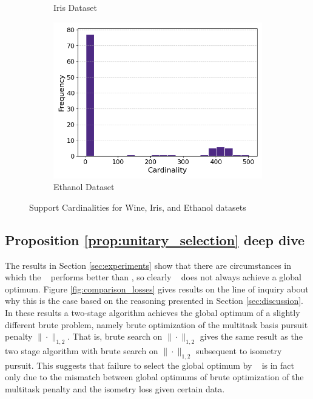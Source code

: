 \begin{figure}[t]
\begin{subfigure}[b]{0.3\textwidth}
        \caption{Iris Dataset}
        \label{fig:iris_cardinalities}
    \end{subfigure}
    \hfill
    \begin{subfigure}[b]{0.3\textwidth}
        \centering
        \includegraphics[width=\textwidth]{../figures/ethanol_cardinalities}
        \caption{Ethanol Dataset}
        \label{fig:ethanol_cardinalities}
    \end{subfigure}
    \caption{Support Cardinalities for Wine, Iris, and Ethanol datasets}
    \label{fig:support_cardinalities}
\end{figure}

\newpage

\subsection{Proposition \ref{prop:unitary_selection} deep dive}
\label{sec:deep_dive}

The results in Section \ref{sec:experiments} show that there are circumstances in which the \greedy~ performs better than \tsip, so clearly \tsip~ does not always achieve a global optimum.
Figure \ref{fig:comparison_losses} gives results on the line of inquiry about why this is the case based on the reasoning presented in Section \ref{sec:discussion}.
In these results a two-stage algorithm achieves the global optimum of a slightly different brute problem, namely brute optimization of the multitask basis pursuit penalty $\|\cdot \|_{1,2}$.
That is, brute search on $\|\cdot \|_{1,2}$ gives the same result as the two stage algorithm with brute search on $\|\cdot \|_{1,2}$ subsequent to isometry pursuit.
This suggests that failure to select the global optimum by \tsip~ is in fact only due to the mismatch between global optimums of brute optimization of the multitask penalty and the isometry loss given certain data.

